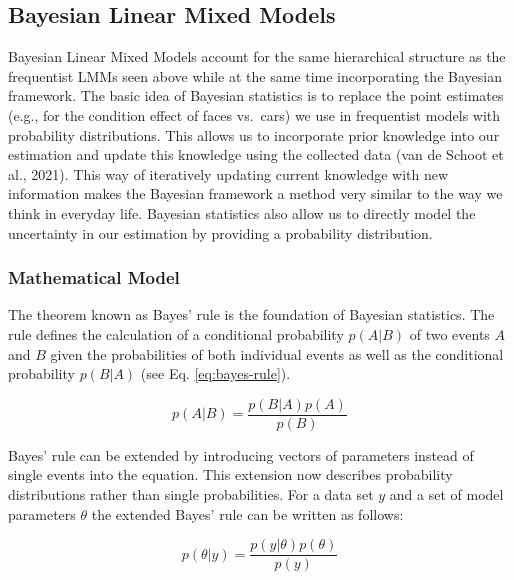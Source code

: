 \documentclass[
  doc,12pt,floatsintext]{apa7}
\begin{document}
\subsection{Bayesian Linear Mixed Models}\label{bayesian-linear-mixed-models}

Bayesian Linear Mixed Models account for the same hierarchical structure as the frequentist LMMs seen above while at the same time incorporating the Bayesian framework. The basic idea of Bayesian statistics is to replace the point estimates (e.g., for the condition effect of faces vs.~cars) we use in frequentist models with probability distributions. This allows us to incorporate prior knowledge into our estimation and update this knowledge using the collected data (van de Schoot et al., 2021). This way of iteratively updating current knowledge with new information makes the Bayesian framework a method very similar to the way we think in everyday life. Bayesian statistics also allow us to directly model the uncertainty in our estimation by providing a probability distribution.

\subsubsection{Mathematical Model}\label{mathematical-model}

The theorem known as Bayes' rule is the foundation of Bayesian statistics. The rule defines the calculation of a conditional probability \(p(A|B)\) of two events \(A\) and \(B\) given the probabilities of both individual events as well as the conditional probability \(p(B|A)\) (see Eq. \eqref{eq:bayes-rule}).

\begin{equation}
p(A|B) = \frac{p(B|A)p(A)}{p(B)}
\label{eq:bayes-rule}
\end{equation}

Bayes' rule can be extended by introducing vectors of parameters instead of single events into the equation. This extension now describes probability distributions rather than single probabilities. For a data set \(y\) and a set of model parameters \(\theta\) the extended Bayes' rule can be written as follows:

\begin{equation}
p(\theta|y) = \frac{p(y|\theta)p(\theta)}{p(y)}
\label{eq:bayes-rule-distributions}
\end{equation}
\end{document}

